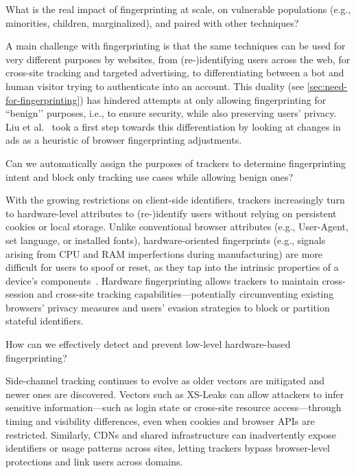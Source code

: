 \begin{opbox}
What is the real impact of fingerprinting at scale, on vulnerable populations (e.g., minorities, children, marginalized), and paired with other techniques?
\end{opbox}


A main challenge with fingerprinting is that the same techniques can be used for very different purposes by websites, from (re-)identifying users across the web, for cross-site tracking and targeted advertising, to differentiating between a bot and human visitor trying to authenticate into an account. This duality (see \autoref{sec:need-for-fingerprinting}) has hindered attempts at only allowing fingerprinting for ``benign’’ purposes, i.e., to ensure security, while also preserving users' privacy. Liu et al.~\cite{liuFirstEarlyEvidence2025} took a first step towards this differentiation by looking at changes in ads as a heuristic of browser fingerprinting adjustments.

\begin{opbox}
Can we automatically assign the purposes of trackers to determine fingerprinting intent and block only tracking use cases while allowing benign ones?
\end{opbox}


With the growing restrictions on client-side identifiers, trackers increasingly turn to hardware-level attributes to (re-)identify users without relying on persistent cookies or local storage.
%
Unlike conventional browser attributes (e.g., User-Agent, set language, or installed fonts), hardware-oriented fingerprints (e.g., signals arising from CPU and RAM imperfections during manufacturing) are more difficult for users to spoof or reset, as they tap into the intrinsic properties of a device’s components~\cite{venugopalanFPRowhammerDRAMBasedDevice2024}.
%
Hardware fingerprinting allows trackers to maintain cross-session and cross-site tracking capabilities---potentially circumventing existing browsers' privacy measures and users' evasion strategies to block or partition stateful identifiers.

\begin{opbox}
How can we effectively detect and prevent low-level hardware-based fingerprinting?
\end{opbox}



%
Side-channel tracking continues to evolve as older vectors are mitigated and newer ones are discovered. 
%
Vectors such as XS-Leaks can allow attackers to infer sensitive information---such as login state or cross-site resource access---through timing and visibility differences, even when cookies and browser APIs are restricted. 
%
Similarly, CDNs and shared infrastructure can inadvertently expose identifiers or usage patterns across sites, letting trackers bypass browser-level protections and link users across domains.

